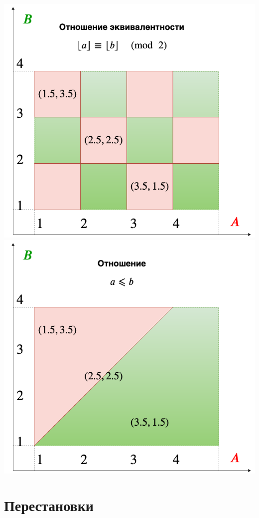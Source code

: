 \begin{center}
\includegraphics[scale=0.25]{equiv.png}
\includegraphics[scale=0.25]{lessthan.png}
\end{center}




\chapter{Перестановки}


